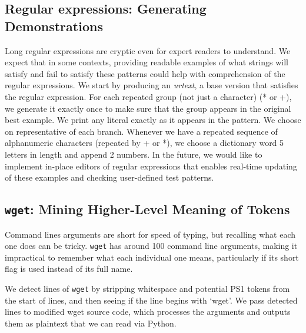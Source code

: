 \subsection{Regular expressions: Generating Demonstrations}

Long regular expressions are cryptic even for expert readers to understand.
We expect that in some contexts, providing readable examples of what strings will satisfy and fail to satisfy these patterns could help with comprehension of the regular expressions.
We start by producing an \emph{urtext}, a base version that satisfies the regular expression.
For each repeated group (not just a character) (* or +), we generate it exactly once to make sure that the group appears in the original best example.
We print any literal exactly as it appears in the pattern.
We choose on representative of each branch.
Whenever we have a repeated sequence of alphanumeric characters (repeated by + or *), we choose a dictionary word 5 letters in length and append 2 numbers.
In the future, we would like to implement in-place editors of regular expressions that enables real-time updating of these examples and checking user-defined test patterns.

\subsection{\texttt{wget}: Mining Higher-Level Meaning of Tokens}

\begin{figure}
\end{figure}

Command lines arguments are short for speed of typing, but recalling what each one does can be tricky.
\texttt{wget} has around 100 command line arguments, making it impractical to remember what each individual one means, particularly if its short flag is used instead of its full name.

We detect lines of \texttt{wget} by stripping whitespace and potential PS1 tokens from the start of lines, and then seeing if the line begins with `wget'.
We pass detected lines to modified wget source code, which processes the arguments and outputs them as plaintext that we can read via Python.

